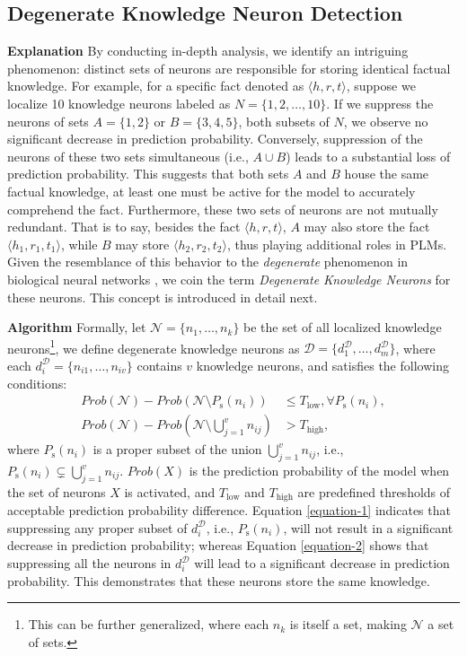 \documentclass[]{article}
\newcommand{\vpara}[1]{\vspace{0.05in}\noindent\textbf{#1 }}
\begin{document}
\subsection{Degenerate Knowledge Neuron Detection}
\vpara{Explanation}
By conducting in-depth analysis, we identify an intriguing phenomenon: distinct sets of neurons are responsible for storing identical factual knowledge. For example, for a specific fact denoted as \(\langle h,r,t\rangle \), suppose we localize 10 knowledge neurons labeled as \(N = \{1, 2, \ldots, 10\}\). If we suppress the neurons of sets \(A = \{1, 2\}\) or \(B = \{3, 4, 5\}\), both subsets of $N$, we observe no significant decrease in prediction probability. Conversely, suppression of the neurons of these two sets simultaneous (i.e., \(A \cup B\)) leads to a substantial loss of prediction probability. This suggests that both sets \(A\) and \(B\) house the same factual knowledge, at least one must be active for the model to accurately comprehend the fact. Furthermore, these two sets of neurons are not mutually redundant. That is to say, besides the fact \(\langle h,r,t\rangle \), \(A\) may also store the fact \(\langle h_1, r_1, t_1\rangle \), while \(B\) may store \(\langle h_2, r_2, t_2\rangle \), thus playing additional roles in PLMs.
Given the resemblance of this behavior to the \textit{degenerate} phenomenon in biological neural networks \cite{degenerate_biological,mason2015degeneracy}, we coin the term \textit{Degenerate Knowledge Neurons} for these neurons. This concept is introduced in detail next.

\vpara{Algorithm}
Formally, let $\mathcal{N}=\{n_1, \ldots, n_k\}$ be the set of all localized knowledge neurons\footnote{This can be further generalized, where each $n_k$ is itself a set, making $\mathcal{N}$ a set of sets.}, we define degenerate knowledge neurons as $\mathcal{D} = \{d^{\mathcal{D}}_1, \ldots, d^{\mathcal{D}}_m \}$, where each $d^{\mathcal{D}}_i=\{n_{i1}, \ldots, n_{iv}\}$ contains $v$ knowledge neurons, and satisfies the following conditions:
{\small \begin{align}
Prob(\mathcal{N}) - Prob(\mathcal{N}\setminus P_{\text{s}}(n_i)) &\leq T_{\text{low}}, \forall P_{\text{s}}(n_i), \label{equation-1}\\
Prob(\mathcal{N}) - Prob(\mathcal{N}\setminus \bigcup_{j=1}^v n_{ij}) &> T_{\text{high}} \label{equation-2},
\end{align}}where $P_{\text{s}}(n_i)$ is a proper subset of the union $\bigcup_{j=1}^v n_{ij}$, i.e., $P_{\text{s}}(n_i) \subsetneq \bigcup_{j=1}^v n_{ij}$. \(Prob(X)\) is the prediction probability of the model when the set of neurons \(X\) is activated, and \(T_{\text{low}}\) and \(T_{\text{high}}\) are predefined thresholds of acceptable prediction probability difference. Equation \eqref{equation-1} indicates that suppressing any proper subset of \(d^{\mathcal{D}}_i\), i.e., $P_{\text{s}}(n_i)$, will not result in a significant decrease in prediction probability; whereas Equation \eqref{equation-2} shows that suppressing all the neurons in \(d^{\mathcal{D}}_i\) will lead to a significant decrease in prediction probability. This demonstrates that these neurons store the same knowledge.
\end{document}
